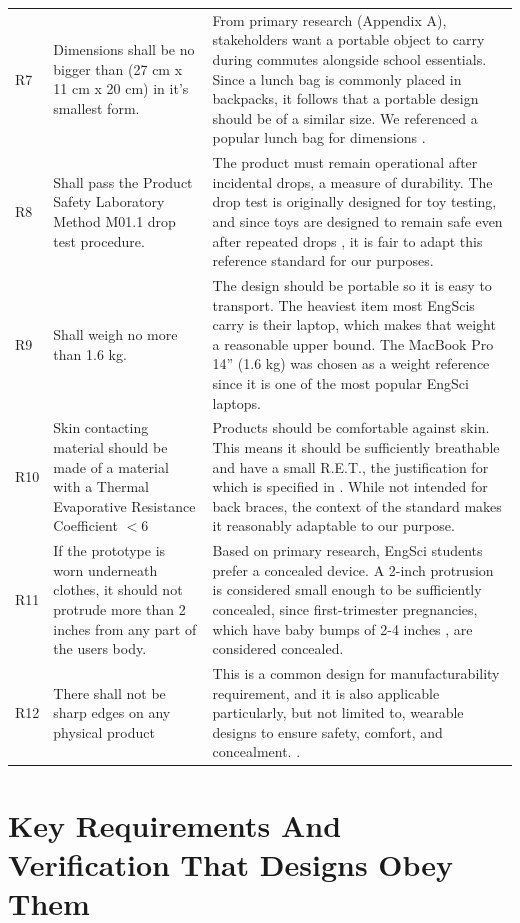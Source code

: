 \documentclass[11pt]{article}
\begin{document}
\begin{xltabular}{\linewidth}{p{24pt} X X}
R7 & Dimensions shall be no bigger than (27 cm x 11 cm x 20 cm) in it's smallest form. & From primary research (Appendix A), stakeholders want a portable object to carry during commutes alongside school essentials. Since a lunch bag is commonly placed in backpacks, it follows that a portable design should be of a similar size. We referenced a popular lunch bag for dimensions \cite{RefWorks:69}. \\
R8 & Shall pass the Product Safety Laboratory Method M01.1 drop test procedure. \cite{RefWorks:64} & The product must remain operational after incidental drops, a measure of durability. The drop test is originally designed for toy testing, and since toys are designed to remain safe even after repeated drops \cite{RefWorks:68}, it is fair to adapt this reference standard for our purposes. \\
R9 & Shall weigh no more than 1.6 kg. & The design should be portable so it is easy to transport. The heaviest item most EngScis carry is their laptop, which makes that weight a reasonable upper bound. The MacBook Pro 14” (1.6 kg) \cite{RefWorks:67} was chosen as a weight reference since it is one of the most popular EngSci laptops. \\ 
R10 & Skin contacting material should be made of a material with a Thermal Evaporative Resistance Coefficient $< 6$ & Products should be comfortable against skin. This means it should be sufficiently breathable and have a small R.E.T., the justification for which is specified in \cite{RefWorks:13}. While not intended for back braces, the context of the standard makes it reasonably adaptable to our purpose. \\
R11 & If the prototype is worn underneath clothes, it should not protrude more than 2 inches from any part of the users body. & Based on primary research, EngSci students prefer a concealed device. A 2-inch protrusion is considered small enough to be sufficiently concealed, since first-trimester pregnancies, which have baby bumps of 2-4 inches \cite{RefWorks:74}, are considered concealed. \\
R12 & There shall not be sharp edges on any physical product & This is a common design for manufacturability requirement, and it is also applicable particularly, but not limited to, wearable designs to ensure safety, comfort, and concealment. \cite{RefWorks:65}.
\label{table:requirements}

\end{xltabular}


\section{Key Requirements And Verification That Designs Obey Them}
\end{document}
